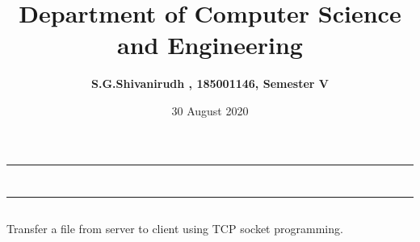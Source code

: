 \documentclass[12pt,letterpaper]{article}
\title{\textbf{Department of Computer Science and Engineering}}
\author{\textbf{S.G.Shivanirudh , 185001146, Semester V }}
\date{30 August 2020}
\begin{document}
\maketitle
\hrule
\section*{}
\hrule 
\bigskip\bigskip

\subsection*{}

\subsection*{}
\begin{flushleft}
Transfer a file from server to client using TCP socket programming.
\end{flushleft}

\subsection*{}
\subsubsection*{}
\begin{flushleft}

\end{flushleft}
\subsubsection*{}
\begin{flushleft}

\end{flushleft}

\subsection*{}
\subsubsection*{}
\begin{flushleft}

\end{flushleft}
\subsubsection*{}
\begin{flushleft}

\end{flushleft}
\end{document}
